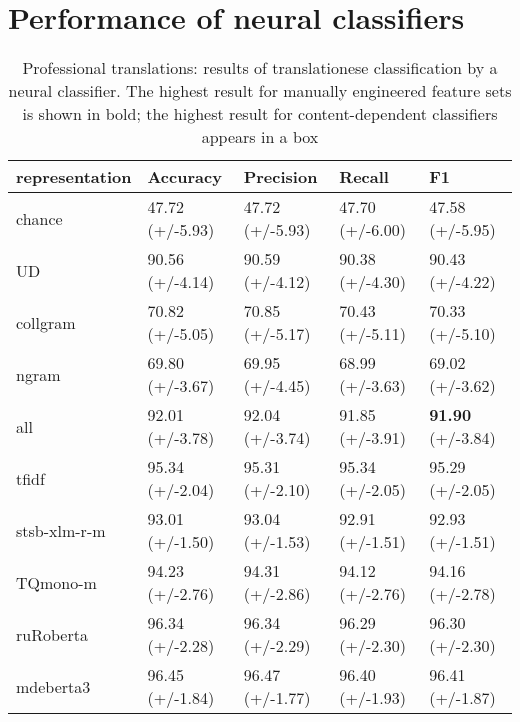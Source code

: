 \chapter{\label{appx:neural_res}Performance of neural classifiers}

\begin{table}[H]
	\centering
	\begin{tabular}{l|llll}
		\toprule
		representation & Accuracy        & Precision       & Recall          & F1              \\
		\midrule
		chance          & 47.72 (+/-5.93) & 47.72 (+/-5.93) & 47.70 (+/-6.00) & 47.58 (+/-5.95) \\
		\midrule
		UD              & 90.56 (+/-4.14) & 90.59 (+/-4.12) & 90.38 (+/-4.30) & 90.43 (+/-4.22) \\
		collgram        & 70.82 (+/-5.05) & 70.85 (+/-5.17) & 70.43 (+/-5.11) & 70.33 (+/-5.10) \\
		ngram           & 69.80 (+/-3.67) & 69.95 (+/-4.45) & 68.99 (+/-3.63) & 69.02 (+/-3.62) \\
		all             & 92.01 (+/-3.78) & 92.04 (+/-3.74) & 91.85 (+/-3.91) & \textbf{91.90} (+/-3.84) \\
		\midrule
		tfidf           & 95.34 (+/-2.04) & 95.31 (+/-2.10) & 95.34 (+/-2.05) & 95.29 (+/-2.05) \\
		stsb-xlm-r-m         & 93.01 (+/-1.50) & 93.04 (+/-1.53) & 92.91 (+/-1.51) & 92.93 (+/-1.51) \\
		TQmono-m       & 94.23 (+/-2.76) & 94.31 (+/-2.86) & 94.12 (+/-2.76) & 94.16 (+/-2.78) \\
		ruRoberta & 96.34 (+/-2.28) & 96.34 (+/-2.29) & 96.29 (+/-2.30) & 96.30 (+/-2.30) \\
		mdeberta3  & 96.45 (+/-1.84) & 96.47 (+/-1.77) & 96.40 (+/-1.93) & \boxit{0.4in}96.41 (+/-1.87) \\
	\bottomrule
	\end{tabular}
	\caption{\label{tab:pro-ref_neu}Professional translations: results of translationese classification by a neural classifier. The highest result for manually engineered feature sets is shown in bold; the highest result for content-dependent classifiers appears in a box}
\end{table}

